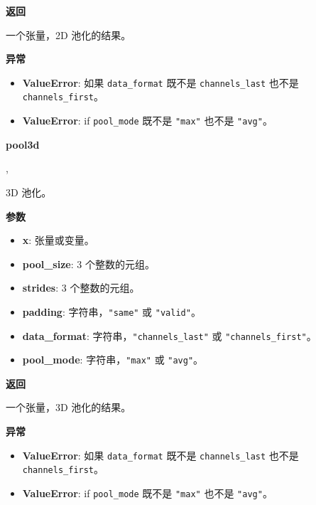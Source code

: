 \textbf{返回}

一个张量，2D 池化的结果。

\textbf{异常}

\begin{itemize}
\tightlist
\item
  \textbf{ValueError}: 如果 \texttt{data\_format} 既不是
  \texttt{channels\_last} 也不是 \texttt{channels\_first}。
\item
  \textbf{ValueError}: if \texttt{pool\_mode} 既不是 \texttt{"max"}
  也不是 \texttt{"avg"}。
\end{itemize}


\textbf{pool3d}\label{pool3d}

\begin{Shaded}
\begin{Highlighting}[]
\OperatorTok{=}\NormalTok{(}\NormalTok{, }\NormalTok{, }\OperatorTok{=}, \\
\hspace{3cm}\OperatorTok{=}\OperatorTok{=}\NormalTok{)}
\end{Highlighting}
\end{Shaded}

3D 池化。

\textbf{参数}

\begin{itemize}
\tightlist
\item
  \textbf{x}: 张量或变量。
\item
  \textbf{pool\_size}: 3 个整数的元组。
\item
  \textbf{strides}: 3 个整数的元组。
\item
  \textbf{padding}: 字符串，\texttt{"same"} 或 \texttt{"valid"}。
\item
  \textbf{data\_format}: 字符串，\texttt{"channels\_last"} 或
  \texttt{"channels\_first"}。
\item
  \textbf{pool\_mode}: 字符串，\texttt{"max"} 或 \texttt{"avg"}。
\end{itemize}

\textbf{返回}

一个张量，3D 池化的结果。

\textbf{异常}

\begin{itemize}
\tightlist
\item
  \textbf{ValueError}: 如果 \texttt{data\_format} 既不是
  \texttt{channels\_last} 也不是 \texttt{channels\_first}。
\item
  \textbf{ValueError}: if \texttt{pool\_mode} 既不是 \texttt{"max"}
  也不是 \texttt{"avg"}。
\end{itemize}


